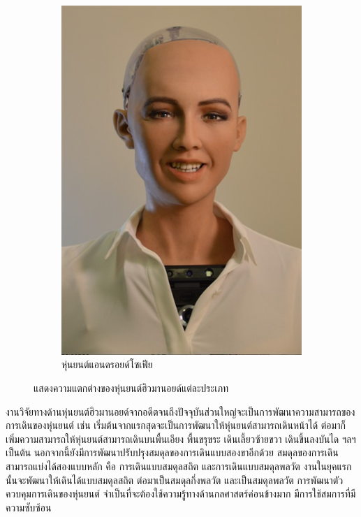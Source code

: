 \begin{figure}[htbp]
\begin{subfigure}[b]{0.3\textwidth}
        \includegraphics[width=\textwidth]{chapter2/images/โซเฟีย.jpg}
        \caption{หุ่นยนต์แอนดรอยด์โซเฟีย}
        \label{fig:โซเฟีย}
    \end{subfigure}
    \caption{แสดงความแตกต่างของหุ่นยนต์ฮิวมานอยด์แต่ละประเภท}
    \label{fig:diff_humanoid}
\end{figure}

งานวิจัยทางด้านหุ่นยนต์ฮิวมานอยด์จากอดีตจนถึงปัจจุบันส่วนใหญ่จะเป็นการพัฒนาความสามารถของการเดินของหุ่นยนต์
เช่น เริ่มต้นจากแรกสุดจะเป็นการพัฒนาให้หุ่นยนต์สามารถเดินหน้าได้ ต่อมาก็เพิ่มความสามารถให้หุ่นยนต์สามารถเดินบนพื้นเอียง พื้นขรุขระ
เดินเลี้ยวซ้ายขวา เดินขึ้นลงบันได ฯลฯ เป็นต้น นอกจากนี้ยังมีการพัฒนาปรับปรุงสมดุลของการเดินแบบสองขาอีกด้วย สมดุลของการเดินสามารถแบ่งได้สองแบบหลัก
คือ การเดินแบบสมดุลสถิต และการเดินแบบสมดุลพลวัต งานในยุคแรกนั้นจะพัฒนาให้เดินได้แบบสมดุลสถิต ต่อมาเป็นสมดุลกึ่งพลวัต
และเป็นสมดุลพลวัต การพัฒนาตัวควบคุมการเดินของหุ่นยนต์ จำเป็นที่จะต้องใช้ความรู้ทางด้านกลศาสตร์ค่อนข้างมาก มีการใช้สมการที่มีความซับซ้อน

